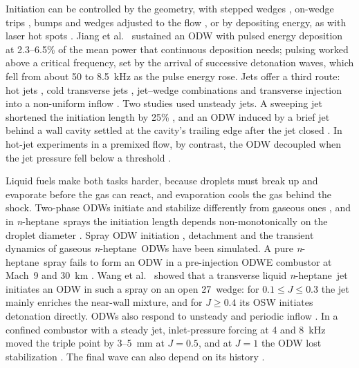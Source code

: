 \documentclass[aip,pof,preprint,amsmath,amssymb]{revtex4-2}
\newcommand{\nh}{\textit{n}-heptane}
\begin{document}
Initiation can be controlled by the geometry, with stepped wedges \cite{Qin2018modified}, on-wedge trips \cite{Han2023trip}, bumps \cite{Zhang2026bump,Yan2026bump} and wedges adjusted to the flow \cite{Sun2023unsteady}, or by depositing energy, as with laser hot spots \cite{Xin2024laser}. Jiang et al.\ \cite{Jiang2025energy} sustained an ODW with pulsed energy deposition at 2.3--6.5\% of the mean power that continuous deposition needs; pulsing worked above a critical frequency, set by the arrival of successive detonation waves, which fell from about 50 to 8.5~kHz as the pulse energy rose. Jets offer a third route: hot jets \cite{Wang2022hotjet,Li2020hotjet,Qin2020coflow,Han2012hotjet}, cold transverse jets \cite{Han2024jet,ZhangJiang2023jet}, jet--wedge combinations \cite{Yao2023jetwedge} and transverse injection into a non-uniform inflow \cite{Ren2025mach}. Two studies used unsteady jets. A sweeping jet shortened the initiation length by 25\% \cite{Fan2024sweeping}, and an ODW induced by a brief jet behind a wall cavity settled at the cavity's trailing edge after the jet closed \cite{Liu2026cavity}. In hot-jet experiments in a premixed flow, by contrast, the ODW decoupled when the jet pressure fell below a threshold \cite{Han2012hotjet}.

Liquid fuels make both tasks harder, because droplets must break up and evaporate before the gas can react, and evaporation cools the gas behind the shock. Two-phase ODWs initiate and stabilize differently from gaseous ones \cite{Ren2018jfm,Ren2019pci}, and in \nh\ sprays the initiation length depends non-monotonically on the droplet diameter \cite{Teng2023droplet,Tian2024jfm}. Spray ODW initiation \cite{Guo2023cnf}, detachment \cite{Guo2025cnf} and the transient dynamics of gaseous \nh\ ODWs \cite{Wu2026heptane} have been simulated. A pure \nh\ spray fails to form an ODW in a pre-injection ODWE combustor at Mach~9 and 30~km \cite{Wang2025cnf}. Wang et al.\ \cite{Wang2026ast} showed that a transverse liquid \nh\ jet initiates an ODW in such a spray on an open 27\textdegree\ wedge: for $0.1 \le J \le 0.3$ the jet mainly enriches the near-wall mixture, and for $J \ge 0.4$ its OSW initiates detonation directly. ODWs also respond to unsteady and periodic inflow \cite{Yang2019jfm,Yang2021pof,Ren2021osc}. In a confined combustor with a steady jet, inlet-pressure forcing at 4 and 8~kHz moved the triple point by 3--5~mm at $J = 0.5$, and at $J = 1$ the ODW lost stabilization \cite{Wang2026confined}. The final wave can also depend on its history \cite{Liu2018hysteresis,Han2025hysteresis}.
\end{document}
